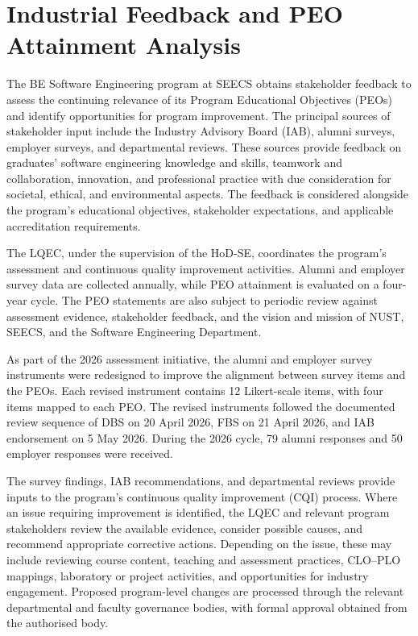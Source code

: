 \section{Industrial Feedback and PEO Attainment Analysis}
\label{sec:c9-industrial-feedback}

The BE Software Engineering program at SEECS obtains stakeholder feedback to assess the continuing relevance of its Program Educational Objectives (PEOs) and identify opportunities for program improvement. The principal sources of stakeholder input include the Industry Advisory Board (IAB), alumni surveys, employer surveys, and departmental reviews. These sources provide feedback on graduates' software engineering knowledge and skills, teamwork and collaboration, innovation, and professional practice with due consideration for societal, ethical, and environmental aspects. The feedback is considered alongside the program's educational objectives, stakeholder expectations, and applicable accreditation requirements.

The LQEC, under the supervision of the HoD-SE, coordinates the program's assessment and continuous quality improvement activities. Alumni and employer survey data are collected annually, while PEO attainment is evaluated on a four-year cycle. The PEO statements are also subject to periodic review against assessment evidence, stakeholder feedback, and the vision and mission of NUST, SEECS, and the Software Engineering Department.

As part of the 2026 assessment initiative, the alumni and employer survey instruments were redesigned to improve the alignment between survey items and the PEOs. Each revised instrument contains 12 Likert-scale items, with four items mapped to each PEO. The revised instruments followed the documented review sequence of DBS on 20 April 2026, FBS on 21 April 2026, and IAB endorsement on 5 May 2026. During the 2026 cycle, 79 alumni responses and 50 employer responses were received.  

The survey findings, IAB recommendations, and departmental reviews provide inputs to the program's continuous quality improvement (CQI) process. Where an issue requiring improvement is identified, the LQEC and relevant program stakeholders review the available evidence, consider possible causes, and recommend appropriate corrective actions. Depending on the issue, these may include reviewing course content, teaching and assessment practices, CLO--PLO mappings, laboratory or project activities, and opportunities for industry engagement. Proposed program-level changes are processed through the relevant departmental and faculty governance bodies, with formal approval obtained from the authorised body.

